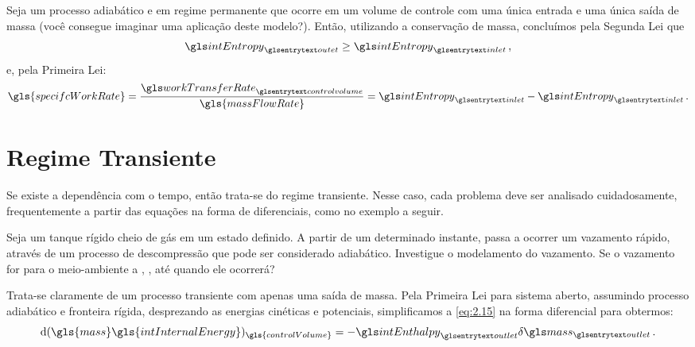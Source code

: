     Seja um processo adiabático e em regime permanente que ocorre em um volume
    de controle com uma única entrada e uma única saída de massa (você consegue
    imaginar uma aplicação deste modelo?). Então, utilizando a conservação de
    massa, concluímos pela Segunda Lei que
    \begin{equation} \label{eq:3.16}
        \gsub{intEntropy}{outet}
        \ge
        \gsub{intEntropy}{inlet}\,,
    \end{equation}
    e, pela Primeira Lei:
    \begin{equation} \label{eq:3.17}
        \gls{specifcWorkRate}
        =
        \frac{
            \gsub{workTransferRate}{controlvolume}
        }{
            \gls{massFlowRate}
        }
        =
        \gsub{intEntropy}{inlet}
        -
        \gsub{intEntropy}{inlet}\,.
    \end{equation}


    \section{Regime Transiente}

    Se existe a dependência com o tempo, então trata-se do regime transiente.
    Nesse caso, cada problema deve ser analisado cuidadosamente, frequentemente
    a partir das equações na forma de diferenciais, como no exemplo a seguir.

    Seja um tanque rígido cheio de gás em um estado definido. A partir de um
    determinado instante, passa a ocorrer um vazamento rápido, através de um
    processo de descompressão que pode ser considerado adiabático. Investigue o
    modelamento do vazamento. Se o vazamento for para o meio-ambiente a
    , ,
    até quando ele ocorrerá?

    Trata-se claramente de um processo transiente com apenas uma saída de
    massa. Pela Primeira Lei para sistema aberto, assumindo processo adiabático
    e fronteira rígida, desprezando as energias cinéticas e potenciais,
    simplificamos a \cref{eq:2.15} na forma diferencial para obtermos:
    \begin{equation} \label{eq:3.18}
        \diff{(
            \gls{mass}
            \gls{intInternalEnergy}
        )}_{\gls{controlVolume}}
        =
        -\gsub{intEnthalpy}{outlet}
        \idiff{\gsub{mass}{outlet}}\,.
    \end{equation}

